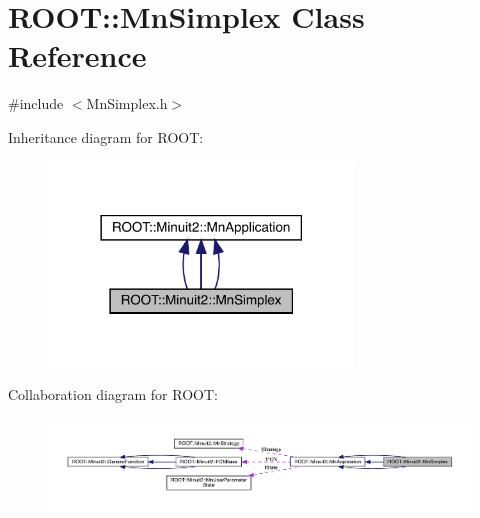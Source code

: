 \hypertarget{classROOT_1_1Minuit2_1_1MnSimplex}{}\section{R\+O\+OT\+:\+:Mn\+Simplex Class Reference}
\label{classROOT_1_1Minuit2_1_1MnSimplex}


{\ttfamily \#include $<$Mn\+Simplex.\+h$>$}



Inheritance diagram for R\+O\+OT\+:
\nopagebreak
\begin{figure}[H]
\begin{center}
\leavevmode
\includegraphics[width=230pt]{d6/d60/classROOT_1_1Minuit2_1_1MnSimplex__inherit__graph}
\end{center}
\end{figure}


Collaboration diagram for R\+O\+OT\+:
\nopagebreak
\begin{figure}[H]
\begin{center}
\leavevmode
\includegraphics[width=350pt]{d3/d9c/classROOT_1_1Minuit2_1_1MnSimplex__coll__graph}
\end{center}
\end{figure}
